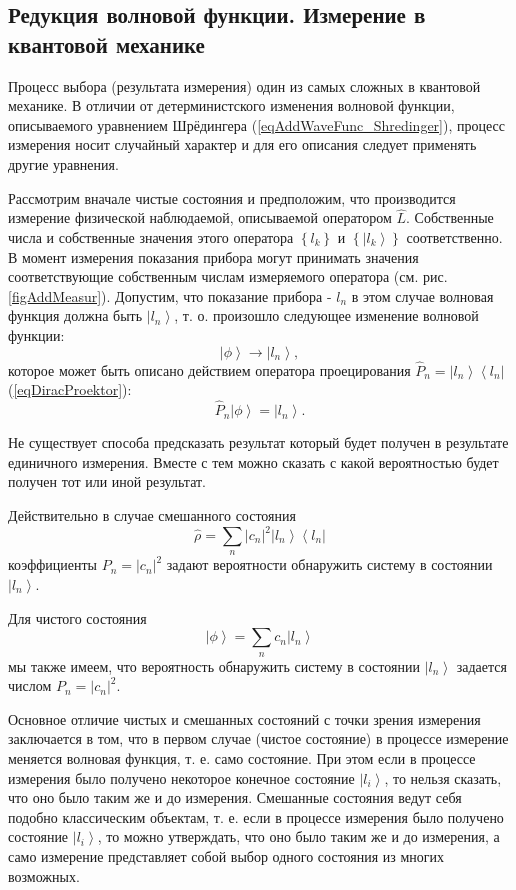 \subsection{Редукция волновой функции. Измерение в квантовой механике}

Процесс выбора (результата измерения) один из самых сложных в
квантовой механике. В отличии от детерминистского изменения волновой
функции, описываемого уравнением Шрёдингера
(\ref{eqAddWaveFunc_Shredinger}), процесс измерения носит случайный
характер и для его описания следует применять другие уравнения. 



Рассмотрим вначале чистые состояния и предположим, что производится
измерение физической наблюдаемой, 
описываемой оператором $\hat{L}$. Собственные числа и собственные
значения этого оператора $\left\{ l_k \right\}$ и 
$\left\{ \left|l_k\right> \right\}$ соответственно. В момент
измерения показания прибора могут принимать значения соответствующие
собственным числам измеряемого оператора
(см. рис. \ref{figAddMeasur}). Допустим, что показание 
прибора - $l_n$ в этом случае волновая функция должна быть 
$\left|l_n\right>$, т. о. произошло следующее
изменение волновой функции:
\[
\left| \phi \right> \rightarrow \left|l_n\right>,
\] 
которое может быть описано действием оператора проецирования 
$\hat{P}_n = \left|l_n\right> \left<l_n\right|$ (\ref{eqDiracProektor}):
\[
\hat{P}_n \left| \phi \right> = \left|l_n\right>.
\]

Не существует способа предсказать результат который будет получен в
результате единичного измерения. Вместе с тем можно сказать с какой
вероятностью будет получен тот или иной результат.

Действительно в случае смешанного состояния
\begin{equation}
\hat{\rho} = 
\sum_n \left|c_n\right|^2 \left|l_n\right>\left<l_n\right|
\nonumber
\end{equation}
коэффициенты $P_n = \left|c_n\right|^2$
задают вероятности обнаружить систему в состоянии $\left|l_n\right>$. 

Для чистого состояния
\begin{equation}
\left| \phi \right> = 
\sum_n c_n \left|l_n\right>
\nonumber
\end{equation}
мы также имеем, что вероятность обнаружить систему в состоянии
$\left|l_n\right>$ задается числом $P_n = \left|c_n\right|^2$. 

Основное отличие чистых и смешанных состояний с точки зрения измерения
заключается в том, что в первом случае (чистое состояние) в процессе
измерение меняется волновая функция, т. е. само состояние. При этом
если в процессе измерения было получено некоторое конечное состояние
$\left|l_i\right>$, то нельзя сказать, что оно было таким же и до
измерения. Смешанные состояния ведут себя подобно классическим объектам,
т. е. если в процессе измерения было получено состояние
$\left|l_i\right>$, то можно утверждать, что оно было таким же и до
измерения, а само измерение представляет собой выбор
одного состояния из многих возможных.

